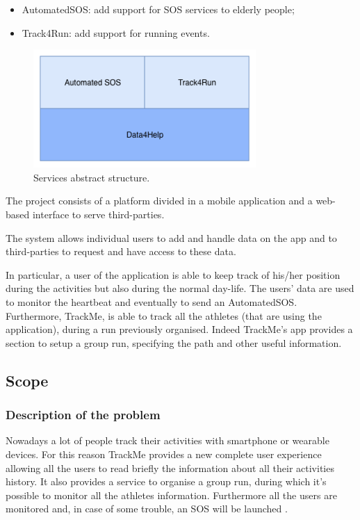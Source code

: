 \documentclass{article}
\begin{document}
\begin{itemize}

\item AutomatedSOS: add support for SOS services to elderly people;
\item Track4Run: add support for running events.
\end{itemize}

\begin{figure}[h!]
  \centering
  \includegraphics[height=4.5cm,keepaspectratio]{Figures/Services.png}
  \caption{Services abstract structure.}
\end{figure}

The project consists of a platform divided in a mobile application and a web-based interface to
serve third-parties.

The system allows individual users to add and handle data on the app
and to third-parties to request and have access to these data.

In particular, a user of the application is able to keep track of 
his/her position during the activities but also during the normal 
day-life. The users’ data are used to monitor the heartbeat and 
eventually to send an AutomatedSOS.
Furthermore, TrackMe, is able to track all the athletes (that are 
using the application), during a run previously organised. 
Indeed TrackMe’s app provides a section to setup a group run, 
specifying the path and other useful information.

\newpage
\subsection{Scope}
\subsubsection{Description of the problem}
Nowadays a lot of people track their activities with smartphone or
wearable devices. For this reason TrackMe provides a new complete user 
experience allowing all the users to read briefly the information
about all their activities history.
It also provides a service to organise a group run, during which
it’s possible to monitor all the athletes information.
Furthermore all the users are monitored and, in case of some trouble, 
an SOS will be launched .
\end{document}
